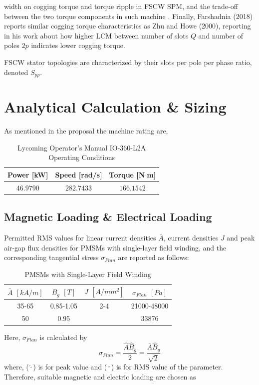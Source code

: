 \documentclass [a4 paper, 11pt, titlepage] {article}
\begin{document}
width on cogging torque and torque ripple in FSCW SPM, and the trade-off between the two torque components in such machine \cite{wu_design_2015}. Finally, Farshadnia (2018) reports similar cogging torque characteristics as Zhu and Howe (2000), reporting in his work about how higher LCM between number of slots $Q$ and number of poles $2p$ indicates lower cogging torque.


	
	FSCW stator topologies are characterized by their slots per pole per phase ratio, denoted $S_{pp}$\cite{farshadnia_advanced_2018}. 
	
	
	
	
	
	
	\section{Analytical Calculation \& Sizing}
	As mentioned in the proposal the machine rating are,
	\begin{table}[h]
		\begin{center}
			\begin{tabular}{c|c|c}
				Power [kW] &  Speed [rad/s] &  Torque [N$\cdot$m]\\
				\hline
				$46.9790$ & $282.7433$ & $166.1542$
			\end{tabular}
		\end{center}
		\caption{Lycoming Operator's Manual IO-360-L2A Operating Conditions}
		\label{fig:EMoperations}
	\end{table}
	

	
	\subsection{Magnetic Loading \& Electrical Loading}
	Permitted RMS values for linear current densities $\bar{A}$, current densities $J$ and peak air-gap flux densities for PMSMs with single-layer field winding, and the corresponding tangential stress $\sigma_{Ftan}$ are reported as follows:
	\begin{table}[h]
		\begin{center}
			\begin{tabular}{c|c|c||c}
				$\bar{A}$ $[kA/m]$ & $\hat{B}_g$ $[T]$ & $J$ $[A/mm^2]$ & $\sigma_{Ftan}$ $[Pa]$ \\
				\hline
				35-65 &  0.85-1.05 & 2-4 & 21000-48000\\
				50 &  0.95 &  & 33876\\
			\end{tabular}
		\end{center}
		\caption{PMSMs with Single-Layer Field Winding }
		\label{fig:EMoperations}
	\end{table}
	Here, $\sigma_{Ftan}$ is calculated by
	\begin{equation}
		\sigma_{Ftan}=\frac{\hat{A}\hat{B}_g}{2}=\frac{\bar{A}\hat{B}_g}{\sqrt{2}}
	\end{equation}
	where, ($\hat{\cdot}$) is for peak value and ($\bar{\cdot}$) is for RMS value of the parameter.
	Therefore, suitable magnetic and electric loading are chosen as
	
\end{document}
